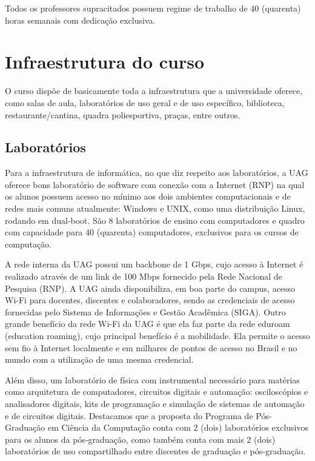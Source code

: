 \documentclass[
	12pt,				%
	openright,			%
  oneside,     %
	a4paper,			%
 hyphens,
	chapter=TITLE,		%
	english,			%
	french,				%
	spanish,			%
	brazil				%
	]{abntex2}
\begin{document}
Todos os professores supracitados possuem regime de trabalho de 40 (quarenta) horas semanais com dedicação exclusiva.





%
%

\chapter{Infraestrutura do curso}

O curso dispõe de basicamente toda a infraestrutura que a universidade oferece, como salas de aula, laboratórios de uso geral e de uso específico, biblioteca, restaurante/cantina, quadra poliesportiva, praças, entre outros. 

\section{Laboratórios}

Para a infraestrutura de informática, no que diz respeito aos laboratórios, a UAG oferece bons laboratório de software com conexão com a Internet (RNP) na qual os alunos possuem acesso no mínimo aos dois ambientes computacionais e de redes mais comuns atualmente: Windows e UNIX, como uma distribuição Linux, rodando em dual-boot. São 8 laboratórios de ensino com computadores e quadro com capacidade para 40 (quarenta) computadores, exclusivos para os cursos de computação.

A rede interna da UAG possui um backbone de 1 Gbps, cujo acesso à Internet é realizado através de um link de 100 Mbps fornecido pela Rede Nacional de Pesquisa (RNP). A UAG ainda disponibiliza, em boa parte do campus, acesso Wi-Fi para docentes, discentes e colaboradores, sendo as credenciais de acesso fornecidas pelo Sistema de Informações e Gestão Acadêmica (SIGA). Outro grande benefício da rede Wi-Fi da UAG é que ela faz parte da rede eduroam (education roaming), cujo principal benefício é a mobilidade. Ela permite o acesso sem fio à Internet localmente e em milhares de pontos de acesso no Brasil e no mundo com a utilização de uma mesma credencial.

Além disso, um laboratório de física com  instrumental necessário para matérias como arquitetura de computadores, circuitos digitais e automação: osciloscópios e analisadores digitais, kits de programação e simulação de sistemas de automação e de circuitos digitais. Destacamos que a proposta do Programa de Pós-Graduação em Ciência da Computação conta com 2 (dois) laboratórios exclusivos para os alunos da pós-graduação, como também conta com mais 2 (dois) laboratórios de uso compartilhado entre discentes de graduação e pós-graduação.
\end{document}
